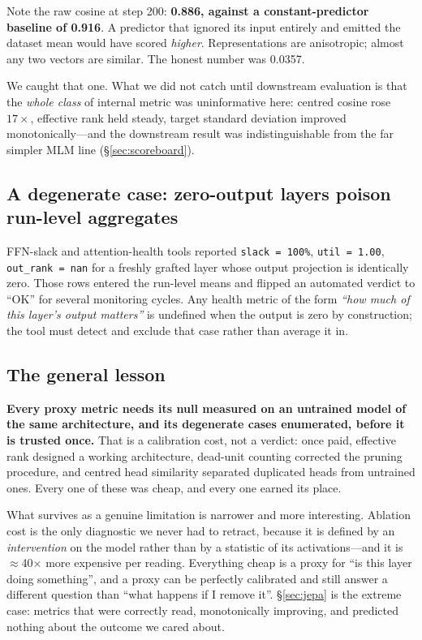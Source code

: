 \documentclass[11pt,a4paper]{article}
\begin{document}
Note the raw cosine at step 200: \textbf{0.886, against a constant-predictor baseline of
0.916}. A predictor that ignored its input entirely and emitted the dataset mean would have
scored \emph{higher}. Representations are anisotropic; almost any two vectors are similar. The
honest number was 0.0357.

We caught that one. What we did not catch until downstream evaluation is that the \emph{whole
class} of internal metric was uninformative here: centred cosine rose $17\times$, effective
rank held steady, target standard deviation improved monotonically---and the downstream result
was indistinguishable from the far simpler MLM line (\S\ref{sec:scoreboard}).

\subsection{A degenerate case: zero-output layers poison run-level aggregates}

FFN-slack and attention-health tools reported \texttt{slack = 100\%}, \texttt{util = 1.00},
\texttt{out\_rank = nan} for a freshly grafted layer whose output projection is identically
zero. Those rows entered the run-level means and flipped an automated verdict to ``OK'' for
several monitoring cycles. Any health metric of the form \emph{``how much of this layer's
output matters''} is undefined when the output is zero by construction; the tool must detect
and exclude that case rather than average it in.

\subsection{The general lesson}

\textbf{Every proxy metric needs its null measured on an untrained model of the same
architecture, and its degenerate cases enumerated, before it is trusted once.} That is a
calibration cost, not a verdict: once paid, effective rank designed a working architecture,
dead-unit counting corrected the pruning procedure, and centred head similarity separated
duplicated heads from untrained ones. Every one of these was cheap, and every one earned its
place.

What survives as a genuine limitation is narrower and more interesting. Ablation cost is the
only diagnostic we never had to retract, because it is defined by an \emph{intervention} on the
model rather than by a statistic of its activations---and it is $\approx$40$\times$ more
expensive per reading. Everything cheap is a proxy for ``is this layer doing something'', and a
proxy can be perfectly calibrated and still answer a different question than ``what happens if
I remove it''. \S\ref{sec:jepa} is the extreme case: metrics that were correctly read,
monotonically improving, and predicted nothing about the outcome we cared about.
\end{document}
